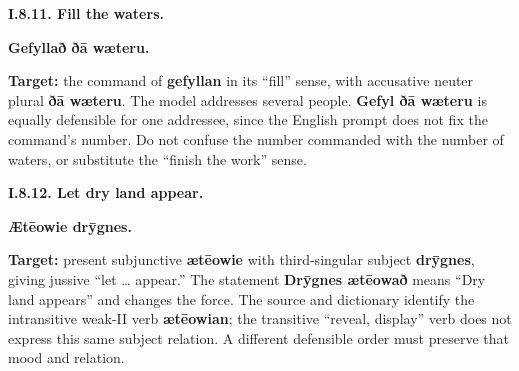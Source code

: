 \par\begin{minipage}{\linewidth}\raggedright
\textbf{I.8.11. Fill the waters.}

\textbf{Gefyllað ðā wæteru.}

\textbf{Target:} the command of \textbf{gefyllan} in its “fill” sense, with accusative neuter plural \textbf{ðā wæteru}. The model addresses several people. \textbf{Gefyl ðā wæteru} is equally defensible for one addressee, since the English prompt does not fix the command's number. Do not confuse the number commanded with the number of waters, or substitute the “finish the work” sense.

\end{minipage}\par\addvspace{4pt}

\par\begin{minipage}{\linewidth}\raggedright
\textbf{I.8.12. Let dry land appear.}

\textbf{Ætēowie drȳgnes.}

\textbf{Target:} present subjunctive \textbf{ætēowie} with third-singular subject \textbf{drȳgnes}, giving jussive “let … appear.” The statement \textbf{Drȳgnes ætēowað} means “Dry land appears” and changes the force. The source and dictionary identify the intransitive weak-II verb \textbf{ætēowian}; the transitive “reveal, display” verb does not express this same subject relation. A different defensible order must preserve that mood and relation.

\end{minipage}\par\addvspace{4pt}


